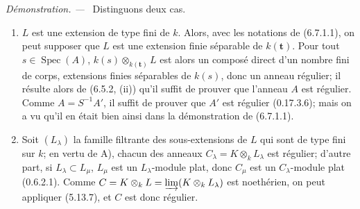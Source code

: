\documentclass[10pt,oneside]{book}
\newenvironment{proof}{%
  \par\medskip\noindent\textit{Démonstration. ---\ }}{\par}
\begin{document}
\begin{proof}
Distinguons deux cas.

\begin{enumerate}
\item[A)] $L$ est une extension de type fini de $k$. Alors, avec les
notations de (6.7.1.1), on peut supposer que $L$ est une extension finie
séparable de $k(\boldsymbol t)$. Pour tout $s\in\operatorname{Spec}(A)$,
$k(s)\otimes_{k(\boldsymbol t)}L$ est alors un composé direct d'un nombre
fini de corps, extensions finies séparables de $k(s)$, donc un anneau
régulier; il résulte alors de (6.5.2, (ii)) qu'il suffit de prouver que
l'anneau $A$ est régulier. Comme $A=S^{-1}A'$, il suffit de prouver que
$A'$ est régulier (0.17.3.6); mais on a vu qu'il en était bien ainsi dans
la démonstration de (6.7.1.1).
\item[B)] Soit $(L_\lambda)$ la famille filtrante des sous-extensions de
$L$ qui sont de type fini sur $k$; en vertu de A), chacun des anneaux
$C_\lambda=K\otimes_kL_\lambda$ est régulier; d'autre part, si
$L_\lambda\subset L_\mu$, $L_\mu$ est un $L_\lambda$-module plat, donc
$C_\mu$ est un $C_\lambda$-module plat (0.6.2.1). Comme
$C=K\otimes_kL=\varinjlim(K\otimes_kL_\lambda)$ est noethérien, on peut
appliquer (5.13.7), et $C$ est donc régulier.
\end{enumerate}
\end{proof}
\end{document}
